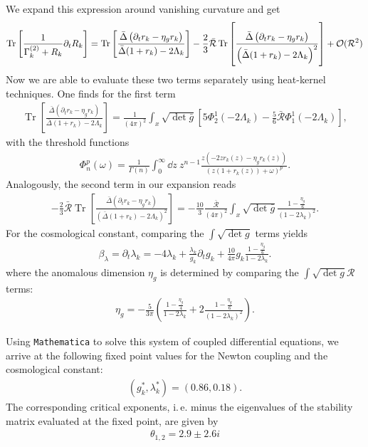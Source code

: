 We expand this expression around vanishing curvature and get
\begin{align}
\operatorname{Tr}\left[\frac{1}{\Gamma_{k}^{(2)} + R_k}\partial_t R_k\right] = \operatorname{Tr}\left[\frac{\bar{\Delta}\left(\partial_t r_k - \eta_g r_k\right)}{\bar{\Delta}(1+r_k)-2\Lambda_k}\right] - \frac{2}{3}\bar{\mathcal{R}}\operatorname{Tr}\left[\frac{\bar{\Delta}\left(\partial_t r_k - \eta_g r_k\right)}{\left(\bar{\Delta}(1+r_k)-2\Lambda_k\right)^2}\right] + \mathcal{O}(\mathcal{R}^2) 
\end{align}
Now we are able to evaluate these two terms separately using heat-kernel techniques. One finds for the first term
\begin{align}
\operatorname{Tr}\left[\frac{\bar{\Delta}\left(\partial_t r_k - \eta_g r_k\right)}{\bar{\Delta}(1+r_k)-2\Lambda_k}\right] = \frac{1}{(4\pi)^2}\int_x \sqrt{\operatorname{det}\bar{g}} \left[5\Phi_2^1(-2\Lambda_k) - \frac{5}{6}\bar{\mathcal{R}}\Phi^1_1(-2\Lambda_k)\right],
\end{align}
with the threshold functions 
\begin{align}
	\Phi_n^p(\omega) = \frac{1}{\Gamma(n)}\int_0^{\infty}\dd z \ z^{n-1} \frac{z(-2zr_k(z)-\eta_gr_k(z))}{(z(1+r_k(z))+\omega)^p}.
\end{align}
Analogously, the second term in our expansion reads
\begin{align}
	-\frac{2}{3}\bar{\mathcal{R}}\operatorname{Tr}\left[\frac{\bar{\Delta}\left(\partial_t r_k - \eta_g r_k\right)}{\left(\bar{\Delta}(1+r_k)-2\Lambda_k\right)^2}\right] = -\frac{10}{3}\frac{\bar{\mathcal{R}}}{(4\pi)^2}\int_x  \sqrt{\operatorname{det}\bar{g}} \frac{1-\frac{\eta_g}{6}}{(1-2\lambda_k)^2}.
\end{align}
For the cosmological constant, comparing the $\int\sqrt{\operatorname{det}g}$ terms yields
\begin{align}
	\beta_{\lambda} = \partial_t\lambda_k = -4\lambda_k + \frac{\lambda_k}{g_k} \partial_t g_k + \frac{10}{4\pi}g_k\frac{1-\frac{\eta_g}{6}}{1-2\lambda_k}.
\end{align}
where the anomalous dimension $\eta_g$ is determined by comparing the $\int\sqrt{\operatorname{det}g}\mathcal{R}$ terms:
\begin{align}
\eta_g = -\frac{5}{3\pi} \left(\frac{1-\frac{\eta_g}{4}}{1-2\lambda_k} + 2\frac{1-\frac{\eta_g}{6}}{(1-2\lambda_k)^2}\right).	
\end{align}

Using \verb|Mathematica| to solve this system of coupled differential equations, we arrive at the following fixed point values for the Newton coupling and the cosmological constant:
\begin{align}
	(g_k^*, \lambda_k^*) = (0.86, 0.18).
\end{align}
The corresponding critical exponents, i.\,e. minus the eigenvalues of the stability matrix evaluated at the fixed point, are given by
\begin{align}
	\theta_{1,2} = 2.9 \pm 2.6i
\end{align}

